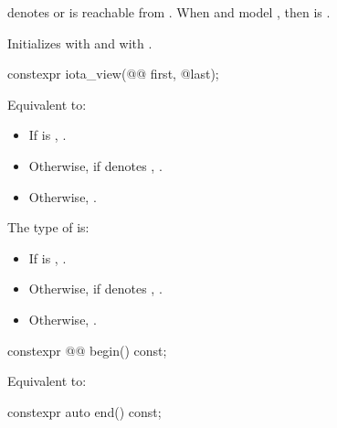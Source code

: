 \begin{itemdescr}
\pnum
\expects
{} denotes  or
 is reachable from .
When  and  model ,
then  is .

\pnum
\effects
Initializes  with  and
 with .
\end{itemdescr}

%
\begin{itemdecl}
constexpr iota_view(@@ first, @\seebelow@ last);
\end{itemdecl}

\begin{itemdescr}
\pnum
\effects
Equivalent to:
\begin{itemize}
\item
If  is ,
.
\item
Otherwise, if  denotes ,
.
\item
Otherwise, .
\end{itemize}

\pnum
\remarks
The type of  is:
\begin{itemize}
\item
If  is , .
\item
Otherwise, if  denotes ,
.
\item
Otherwise, .
\end{itemize}
\end{itemdescr}

%
\begin{itemdecl}
constexpr @@ begin() const;
\end{itemdecl}

\begin{itemdescr}
\pnum
\effects
Equivalent to: 
\end{itemdescr}

%
\begin{itemdecl}
constexpr auto end() const;
\end{itemdecl}

